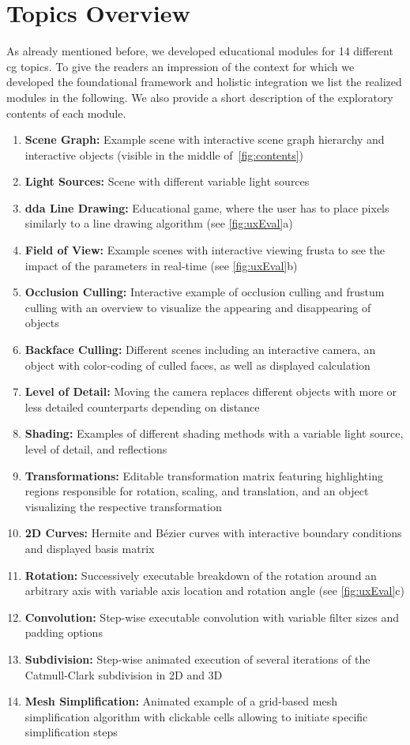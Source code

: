 \section{Topics Overview\label{sec:topics}}
As already mentioned before, we developed educational modules for 14 different \acrshort{cg} topics. To give the readers an impression of the context for which we developed the foundational framework and holistic integration we list the realized modules in the following. We also provide a short description of the exploratory contents of each module.
\begin{enumerate}
	\setlength{\itemsep}{-0.3cm}
	\item \textbf{Scene Graph:} Example scene with interactive scene graph hierarchy and interactive objects (visible in the middle of~\autoref{fig:contents})
	\item \textbf{Light Sources:} Scene with different variable light sources
	\item \textbf{\acrshort{dda} Line Drawing:} Educational game, where the user has to place pixels similarly to a line drawing algorithm (see \autoref{fig:uxEval}a)
	\item \textbf{Field of View:} Example scenes with interactive viewing frusta to see the impact of the parameters in real-time (see \autoref{fig:uxEval}b)
	\item \textbf{Occlusion Culling:} Interactive example of occlusion culling and frustum culling with an overview to visualize the appearing and disappearing of objects
	\item \textbf{Backface Culling:} Different scenes including an interactive camera, an object with color-coding of culled faces, as well as displayed calculation
	\item \textbf{Level of Detail:} Moving the camera replaces different objects with more or less detailed counterparts depending on distance
	\item \textbf{Shading:} Examples of different shading methods with a variable light source, level of detail, and reflections
	\item \textbf{Transformations:} Editable transformation matrix featuring highlighting regions responsible for  rotation, scaling, and translation, and an object visualizing the respective transformation
	\item \textbf{2D Curves:} Hermite and B{\'e}zier curves with interactive boundary conditions and displayed basis matrix
	\item \textbf{Rotation:} Successively executable breakdown of the rotation around an arbitrary axis with variable axis location and rotation angle (see \autoref{fig:uxEval}c)
	\item \textbf{Convolution:} Step-wise executable convolution with variable filter sizes and padding options
	\item \textbf{Subdivision:} Step-wise animated execution of several iterations of the Catmull-Clark subdivision in 2D and 3D
	\item \textbf{Mesh Simplification:} Animated example of a grid-based mesh simplification algorithm with clickable cells allowing to initiate specific simplification steps
\end{enumerate}
